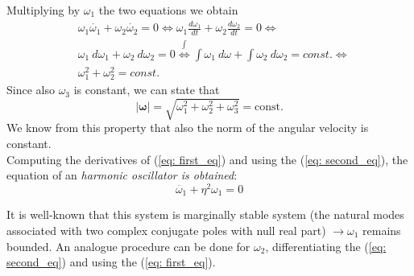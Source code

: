 Multiplying by $\omega_1$ the two equations we obtain
\begin{align*}
    &\omega_1\dot{\omega_1}+\omega_2\dot{\omega_2}=0 \iff
    \omega_1\frac{d\omega_1}{dt}+\omega_2\frac{d\omega_2}{dt}=0 \iff \\
    &\omega_1 \ d\omega_1+\omega_2 \ d\omega_2=0 \overset{\int}{\iff} \int {\omega_1 \ d\omega} + \int {\omega_2 \ d\omega_2}=const. \iff \\
    &\omega_1^2+\omega_2^2=const.
\end{align*}
Since also $\omega_3$ is constant, we can state that 
\begin{equation*}
    \vert \boldsymbol{\omega} \vert = \sqrt{\omega_1^2+\omega_2^2+\omega_3^2} = \text{const.}
\end{equation*}
We know from this property that also the norm of the angular velocity is constant.\\
Computing the derivatives of (\ref{eq: first_eq}) and using the (\ref{eq: second_eq}), the equation of an \textit{harmonic oscillator is obtained}:
\begin{equation}
    \ddot{\omega_1}+\eta^2\omega_1=0
\end{equation}

It is well-known that this system is marginally stable system (the natural modes associated with two complex conjugate poles with null real part) $\to\omega_1$ remains bounded. An analogue procedure can be done for $\omega_2$, differentiating the (\ref{eq: second_eq}) and using the (\ref{eq: first_eq}).

